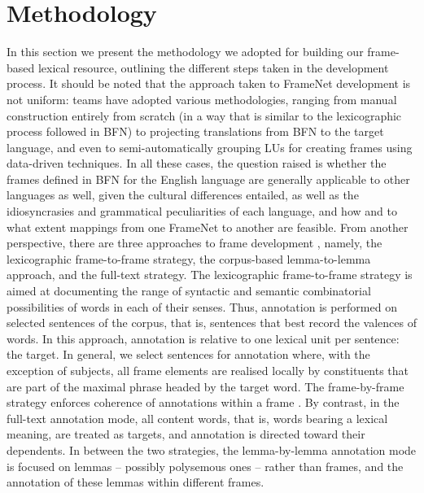 \documentclass[output=paper,colorlinks,citecolor=brown]{langscibook}
\begin{document}
\section{Methodology}\label{sec:methodology}\largerpage
In this section we present the methodology we adopted for building our frame-based lexical resource, outlining the different steps taken in the development process. It should be noted that the approach taken to FrameNet development is not uniform: teams have adopted various methodologies, ranging from manual construction entirely from scratch (in a way that is similar to the lexicographic process followed in BFN) to projecting translations from BFN to the target language, and even to semi-automatically grouping LUs for creating frames using data-driven techniques. In all these cases, the question raised is whether the frames defined in BFN for the English language are generally applicable to other languages as well, given the cultural differences entailed, as well as the idiosyncrasies and grammatical peculiarities of each language, and how and to what extent mappings from one FrameNet to another are feasible. From another perspective, there are three approaches to frame development \citep{ruppenhofer_etal_2016, candito_etal_2014, virk_etal_2021}, namely, the lexicographic frame-to-frame strategy, the corpus-based lemma-to-lemma approach, and the full-text strategy. The lexicographic frame-to-frame strategy is aimed at documenting the range of syntactic and semantic combinatorial possibilities of words in each of their senses. Thus, annotation is performed on selected sentences of the corpus, that is, sentences that best record the valences of words. In this approach, annotation is relative to one lexical unit per sentence: the target. In general, we select sentences for annotation where, with the exception of subjects, all frame elements are realised locally by constituents that are part of the maximal phrase headed by the target word. The frame-by-frame strategy enforces coherence of annotations within a frame \citep{candito_etal_2014}. By contrast, in the full-text annotation mode, all content words, that is, words bearing a lexical meaning, are treated as targets, and annotation is directed toward their dependents. In between the two strategies, the lemma-by-lemma annotation mode is focused on lemmas -- possibly polysemous ones -- rather than frames, and the annotation of these lemmas within different frames. 
\end{document}
